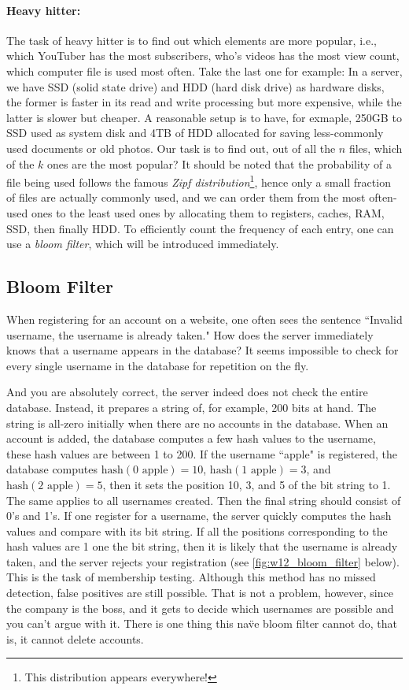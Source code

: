 \paragraph{Heavy hitter:} The task of heavy hitter is to find out which elements are more popular, i.e., which YouTuber has the most subscribers, who's videos has the most view count, which computer file is used most often. Take the last one for example: In a server, we have SSD (solid state drive) and HDD (hard disk drive) as hardware disks, the former is faster in its read and write processing but more expensive, while the latter is slower but cheaper. A reasonable setup is to have, for exmaple, 250GB to SSD used as system disk and 4TB of HDD allocated for saving less-commonly used documents or old photos. Our task is to find out, out of all the $n$ files, which of the $k$ ones are the most popular? It should be noted that the probability of a file being used follows the famous \textit{Zipf distribution}\footnote{This distribution appears everywhere!}, hence only a small fraction of files are actually commonly used, and we can order them from the most often-used ones to the least used ones by allocating them to registers, caches, RAM, SSD, then finally HDD. To efficiently count the frequency of each entry, one can use a \textit{bloom filter}, which will be introduced immediately.

\subsection{Bloom Filter}
When registering for an account on a website, one often sees the sentence ``Invalid username, the username is already taken." How does the server immediately knows that a username appears in the database? It seems impossible to check for every single username in the database for repetition on the fly.

And you are absolutely correct, the server indeed does not check the entire database. Instead, it prepares a string of, for example, 200 bits at hand. The string is all-zero initially when there are no accounts in the database. When an account is added, the database computes a few hash values to the username, these hash values are between 1 to 200. If the username ``apple" is registered, the database computes $\mathrm{hash}(0\text{ apple}) = 10$, $\mathrm{hash}(1\text{ apple}) = 3$, and $\mathrm{hash}(2\text{ apple}) = 5$, then it sets the position 10, 3, and 5 of the bit string to 1. The same applies to all usernames created. Then the final string should consist of 0's and 1's. If one register for a username, the server quickly computes the hash values and compare with its bit string. If all the positions corresponding to the hash values are 1 one the bit string, then it is likely that the username is already taken, and the server rejects your registration (see \autoref{fig:w12_bloom_filter} below). This is the task of membership testing. Although this method has no missed detection, false positives are still possible. That is not a problem, however, since the company is the boss, and it gets to decide which usernames are possible and you can't argue with it. There is one thing this na\"ve bloom filter cannot do, that is, it cannot delete accounts.

